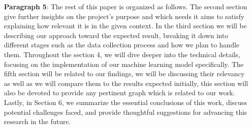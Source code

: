 \textbf{Paragraph 5}: The rest of this paper is organized as follows. The second section give further insights on the project's purpose and which needs it aims to satisfy explaining how relevant it is in the given context. In the third section we will be describing our approach toward the expected result, breaking it down into different stages such as the data collection process and how we plan to handle them. Throughout the section 4, we will dive deeper into the technical details, focusing on the implementation of our machine learning model specifically. The fifth section will be related to our findings, we will be discussing their relevancy as well as we will compare them to the results expected initially, this section will also be devoted to provide any pertinent graph which is related to our work. Lastly, in Section 6, we summarize the essential conclusions of this work, discuss potential challenges faced, and provide thoughtful suggestions for advancing this research in the future.






